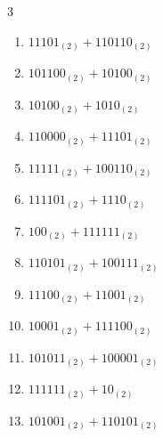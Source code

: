 \begin{multicols}{3}
\begin{enumerate}
  \item $11101_{(2)} + 110110_{(2)}$


  \item $101100_{(2)} + 10100_{(2)}$


  \item $10100_{(2)} + 1010_{(2)}$


  \item $110000_{(2)} + 11101_{(2)}$


  \item $11111_{(2)} + 100110_{(2)}$


\columnbreak %

\resetques

  \item $111101_{(2)} + 1110_{(2)}$


  \item $100_{(2)} + 111111_{(2)}$


  \item $110101_{(2)} + 100111_{(2)}$


  \item $11100_{(2)} + 11001_{(2)}$


  \item $10001_{(2)} + 111100_{(2)}$


  \item $101011_{(2)} + 100001_{(2)}$


  \item $111111_{(2)} + 10_{(2)}$


  \item $101001_{(2)} + 110101_{(2)}$



\end{enumerate}
\end{multicols}
